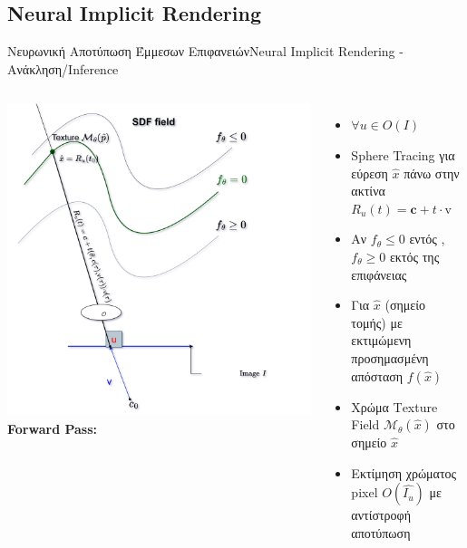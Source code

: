 \documentclass[10pt]{beamer}
\begin{document}
\subsection{Neural Implicit Rendering}
\begin{frame}[t]{Nευρωνική Αποτύπωση Έμμεσων Επιφανειών}{Neural Implicit Rendering - Ανάκληση/Inference}
    \begin{columns}[T]
    \centering
    \includegraphics[height=.6\textheight]{images/NeuralRendering-Page-4.jpg} 
        \textbf{Forward Pass:}
         \begin{itemize}
             \item \(\forall u \in {O(I)} \) 
             \item Sphere Tracing για εύρεση \(\hat{x}\) πάνω στην ακτίνα \(R_u(t) = \boldsymbol{c} + t \cdot\)v 
            \item Αν \(f_\theta \leq 0\) εντός , \(f_\theta \geq 0\) εκτός της επιφάνειας 
            \item Για \(\hat{x}\) (σημείο τομής) με εκτιμώμενη προσημασμένη απόσταση \( f( \hat{x})\) 
            \item Χρώμα Τexture Field \(\mathcal{M_\theta}(\hat{x})\) στο σημείο \(\hat{x}\)
            \item Εκτίμηση χρώματος pixel \(O(\hat{I_u})\) με αντίστροφή αποτύπωση
         \end{itemize}
        
    \end{columns}
\end{frame}
\end{document}
